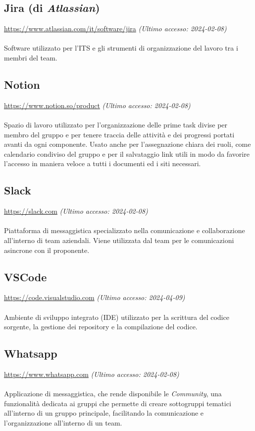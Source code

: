 \documentclass[10pt, a4paper]{article}
\begin{document}
\subsection{Jira (di \textit{Atlassian})}
\href{https://www.atlassian.com/it/software/jira}{https://www.atlassian.com/it/software/jira} \textit{(Ultimo accesso: 2024-02-08)}\\\\
Software utilizzato per l'ITS e gli strumenti di organizzazione del lavoro tra i membri del team.

\subsection{Notion}
\href{https://www.notion.so/product}{https://www.notion.so/product} \textit{(Ultimo accesso: 2024-02-08)}\\\\
Spazio di lavoro utilizzato per l'organizzazione delle prime task divise per membro del gruppo e per tenere traccia delle attività e dei progressi portati avanti da ogni componente. Usato anche per l'assegnazione chiara dei ruoli, come calendario condiviso del gruppo e per il salvataggio link utili in modo da favorire l'accesso in maniera veloce a tutti i documenti ed i siti necessari.

\subsection{Slack}
\href{https://slack.com}{https://slack.com} \textit{(Ultimo accesso: 2024-02-08)}\\\\
Piattaforma di messaggistica specializzato nella comunicazione e collaborazione all'interno di team aziendali. Viene utilizzata dal team per le comunicazioni asincrone con il proponente.

\subsection{VSCode}
\href{https://code.visualstudio.com}{https://code.visualstudio.com} \textit{(Ultimo accesso: 2024-04-09)}\\\\
Ambiente di sviluppo integrato (IDE) utilizzato per la scrittura del codice sorgente, la gestione dei repository e la compilazione del codice.

\subsection{Whatsapp}
\href{https://www.whatsapp.com}{https://www.whatsapp.com} \textit{(Ultimo accesso: 2024-02-08)}\\\\
Applicazione di messaggistica, che rende disponibile le \textit{Community}, una funzionalità dedicata ai gruppi che permette di creare sottogruppi tematici all’interno di un 
gruppo principale, facilitando la comunicazione e l’organizzazione all'interno di un team.
\end{document}
